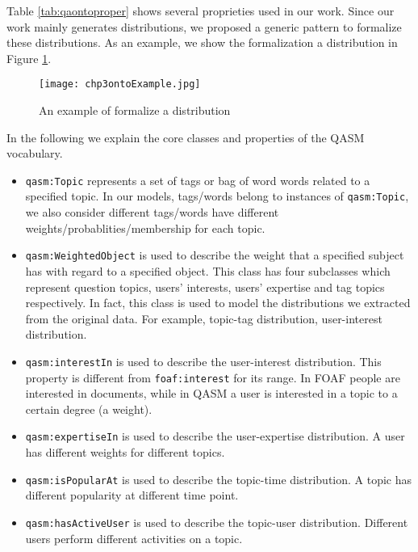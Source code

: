 

Table \ref{tab:qaontoproper} shows several proprieties used in our work. Since our work mainly generates distributions, we proposed a generic pattern to formalize these distributions. As an example, we show the formalization a distribution in Figure \ref{fig:chp3ontoexample}. 

\begin{figure}%
\centering
\texttt{[image: chp3ontoExample.jpg]}  
\caption{An example of formalize a distribution}
\label{fig:chp3ontoexample} 
\end{figure}

In the following we explain the core classes and properties of the QASM vocabulary.

\begin{itemize}
\item \texttt{qasm:Topic} represents a set of tags or bag of word words related to a specified topic. In our models, tags/words belong to instances of \texttt{qasm:Topic}, we also consider different tags/words have different weights/probablities/membership for each topic.
\item \texttt{qasm:WeightedObject} is used to describe the weight that a specified subject has with regard to a specified object. This class has four subclasses which represent question topics, users' interests, users' expertise and tag topics respectively. In fact, this class is used to model the distributions we extracted from the original data. For example, topic-tag distribution, user-interest distribution.
\item \texttt{qasm:interestIn} is used to describe the user-interest distribution. This property is different from \texttt{foaf:interest} for its range. In FOAF people are interested in documents, while in QASM a user is interested in a topic to a certain degree (a weight).
\item \texttt{qasm:expertiseIn} is used to describe the user-expertise distribution. A user has different weights for different topics.
\item \texttt{qasm:isPopularAt} is used to describe the topic-time distribution. A topic has different popularity at different time point.
\item \texttt{qasm:hasActiveUser} is used to describe the topic-user distribution. Different users perform different activities on a topic.
\end{itemize}

